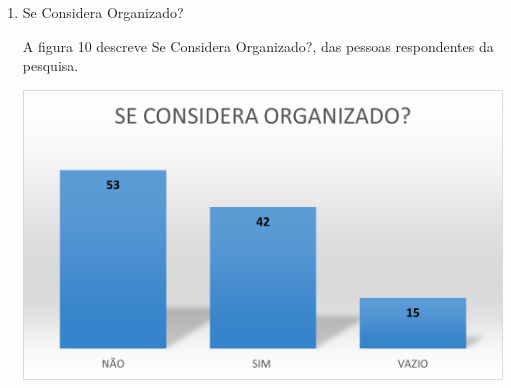 \begin{enumerate}
    \item Se Considera Organizado?

    A figura 10 descreve Se Considera Organizado?, das pessoas respondentes da pesquisa.

    \vspace{\baselineskip}
    \begin{center}
        \begin{minipage}{\textwidth}
            \includegraphics{figs/graph_considera-organizado.png}
            \label{fig:graph_considera-organizado}
        \end{minipage}        
    \end{center}
    
\end{enumerate}
